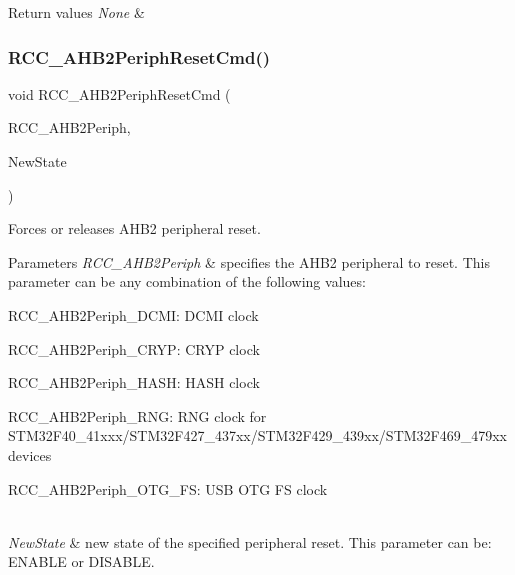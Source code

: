 \begin{DoxyRetVals}{Return values}
{\em None} & \\
\hline
\end{DoxyRetVals}
\mbox{\label{group___r_c_c_gafb119d6d1955d1b8c361e8140845ac5a}} 
\subsubsection{\texorpdfstring{R\+C\+C\+\_\+\+A\+H\+B2\+Periph\+Reset\+Cmd()}{RCC\_AHB2PeriphResetCmd()}}
{\footnotesize\ttfamily void R\+C\+C\+\_\+\+A\+H\+B2\+Periph\+Reset\+Cmd (\begin{DoxyParamCaption}\item[{uint32\+\_\+t}]{R\+C\+C\+\_\+\+A\+H\+B2\+Periph,  }\item[{Functional\+State}]{New\+State }\end{DoxyParamCaption})}



Forces or releases A\+H\+B2 peripheral reset. 


\begin{DoxyParams}{Parameters}
{\em R\+C\+C\+\_\+\+A\+H\+B2\+Periph} & specifies the A\+H\+B2 peripheral to reset. This parameter can be any combination of the following values\+: \begin{DoxyItemize}
\item R\+C\+C\+\_\+\+A\+H\+B2\+Periph\+\_\+\+D\+C\+MI\+: D\+C\+MI clock \item R\+C\+C\+\_\+\+A\+H\+B2\+Periph\+\_\+\+C\+R\+YP\+: C\+R\+YP clock \item R\+C\+C\+\_\+\+A\+H\+B2\+Periph\+\_\+\+H\+A\+SH\+: H\+A\+SH clock \item R\+C\+C\+\_\+\+A\+H\+B2\+Periph\+\_\+\+R\+NG\+: R\+NG clock for S\+T\+M32\+F40\+\_\+41xxx/\+S\+T\+M32\+F427\+\_\+437xx/\+S\+T\+M32\+F429\+\_\+439xx/\+S\+T\+M32\+F469\+\_\+479xx devices \item R\+C\+C\+\_\+\+A\+H\+B2\+Periph\+\_\+\+O\+T\+G\+\_\+\+FS\+: U\+SB O\+TG FS clock \end{DoxyItemize}
\\
\hline
{\em New\+State} & new state of the specified peripheral reset. This parameter can be\+: E\+N\+A\+B\+LE or D\+I\+S\+A\+B\+LE. \\
\hline
\end{DoxyParams}

